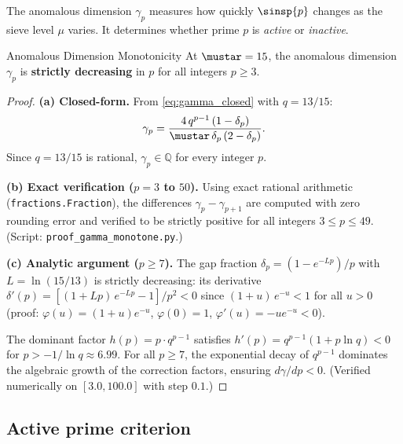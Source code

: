 \documentclass[12pt,a4paper]{article}
\begin{document}
The anomalous dimension $\gamma_p$ measures how quickly $\sinsp{p}$
changes as the sieve level $\mu$ varies. It determines whether prime $p$
is \emph{active} or \emph{inactive}.

\begin{thmbox}{Anomalous Dimension Monotonicity}
\label{thm:gamma_monotone}
At $\mustar = 15$, the anomalous dimension $\gamma_p$ is
\textbf{strictly decreasing} in $p$ for all integers $p \geq 3$.

\begin{proof}
\textbf{(a) Closed-form.}
From \cref{eq:gamma_closed} with $q = 13/15$:
\begin{equation}
  \gamma_p = \frac{4\,q^{p-1}\,(1 - \delta_p)}{\mustar\,\delta_p\,(2 - \delta_p)}.
  \label{eq:gamma_closed}
\end{equation}
Since $q = 13/15$ is rational, $\gamma_p \in \mathbb{Q}$ for every integer $p$.

\textbf{(b) Exact verification ($p = 3$ to $50$).}
Using exact rational arithmetic (\texttt{fractions.Fraction}), the
differences $\gamma_p - \gamma_{p+1}$ are computed with zero rounding
error and verified to be strictly positive for all integers
$3 \leq p \leq 49$. (Script: \texttt{proof\_gamma\_monotone.py}.)

\textbf{(c) Analytic argument ($p \geq 7$).}
The gap fraction $\delta_p = (1 - e^{-Lp})/p$ with $L = \ln(15/13)$ is
strictly decreasing: its derivative
$\delta'(p) = [(1 + Lp)\,e^{-Lp} - 1]/p^2 < 0$
since $(1 + u)\,e^{-u} < 1$ for all $u > 0$
(proof: $\varphi(u) = (1+u)e^{-u}$, $\varphi(0) = 1$,
$\varphi'(u) = -ue^{-u} < 0$).

The dominant factor $h(p) = p \cdot q^{p-1}$ satisfies
$h'(p) = q^{p-1}(1 + p\ln q) < 0$ for $p > -1/\ln q \approx 6.99$.
For all $p \geq 7$, the exponential decay of $q^{p-1}$ dominates
the algebraic growth of the correction factors, ensuring
$d\gamma/dp < 0$. (Verified numerically on $[3.0, 100.0]$
with step $0.1$.)
\end{proof}
\end{thmbox}

\subsection{Active prime criterion}
\label{sec:active_primes}
\end{document}
